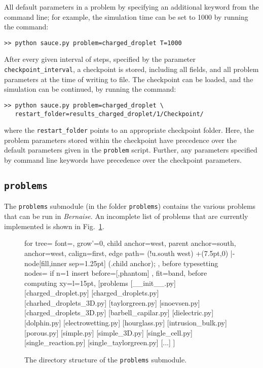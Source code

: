 \documentclass[a4paper,10pt]{article}
\begin{document}
All default parameters in a problem by specifying an additional keyword from the command line; for example, the simulation time can be set to 1000 by running the command:

\begin{verbatim}
>> python sauce.py problem=charged_droplet T=1000
\end{verbatim}

After every given interval of steps, specified by the parameter \texttt{checkpoint\_interval}, a checkpoint is stored, including all fields, and all problem parameters at the time of writing to file.
The checkpoint can be loaded, and the simulation can be continued, by running the command:
\begin{verbatim}
>> python sauce.py problem=charged_droplet \
   restart_folder=results_charged_droplet/1/Checkpoint/
\end{verbatim}
where the \texttt{restart\_folder} points to an appropriate checkpoint folder.
Here, the problem parameters stored within the checkpoint have precedence over the default parameters given in the \texttt{problem} script.
Further, any parameters specified by command line keywords have precedence over the checkpoint parameters.

\subsection{\texttt{problems}}
The \texttt{problems} submodule (in the folder \texttt{problems}) contains the various problems that can be run in \emph{Bernaise}.
An incomplete list of problems that are currently implemented is shown in Fig.\ \ref{fig:dirtree_problems}.
\begin{figure}[H]
  \begin{forest}
    for tree={
      font=\ttfamily,
      grow'=0,
      child anchor=west,
      parent anchor=south,
      anchor=west,
      calign=first,
      edge path={
        \noexpand{}
        (!u.south west) +(7.5pt,0) |- node[fill,inner sep=1.25pt] {} (.child anchor);
      },
      before typesetting nodes={
        if n=1
        {insert before={[,phantom]}}
        {}
      },
      fit=band,
      before computing xy={l=15pt},
    }
    [problems
      [\_\_init\_\_.py]
      [charged\_droplet.py]
      [charged\_droplets.py]
      [charhed\_droplets\_3D.py]
      [taylorgreen.py]
      [snoevsen.py]
      [charged\_droplets\_3D.py]
      [barbell\_capilar.py]
      [dielectric.py]
      [dolphin.py]
      [electrowetting.py]
      [hourglass.py]
      [intrusion\_bulk.py]
      [porous.py]
      [simple.py]
      [simple\_3D.py]
      [single\_cell.py]
      [single\_reaction.py]
      [single\_taylorgreen.py]
      [...]
      ]
  \end{forest}
  \caption{\label{fig:dirtree_problems}
    The directory structure of the \texttt{problems} submodule.}
\end{figure}
\end{document}
